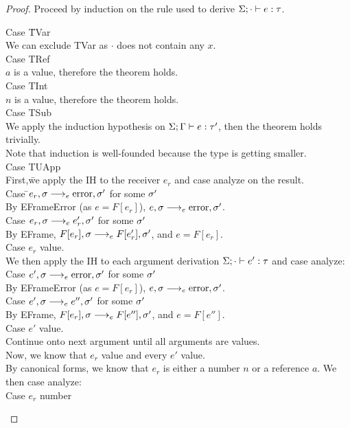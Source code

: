 \documentclass{report}
\begin{document}
\begin{proof}
Proceed by induction on the rule used to derive $\Sigma;\cdot \vdash e : \tau$.
\begin{tabbing}
Case \=TVar\\
\> We can exclude TVar as $\cdot$ does not contain any $x$.\\
Case TRef\\
\> $a$ is a value, therefore the theorem holds. \\
Case TInt\\
\> $n$ is a value, therefore the theorem holds. \\
Case TSub\\
\> We apply the induction hypothesis on $\Sigma;\Gamma\vdash e : \tau'$, then the theorem holds trivially.\\
\> Note that induction is well-founded because the type is getting smaller. \\
Case TUApp\\
\> First,\= we apply the IH to the receiver $e_r$ and case analyze on the result.\\
\> \> Case \=$e_r,\sigma \longrightarrow_{e} \text{error},\sigma'$ for some $\sigma'$\\
\> \> \> By EFrameError (as $e = F[e_r]$), $e,\sigma \longrightarrow_{e} \text{error},\sigma'$.\\
\> \> Case $e_r,\sigma \longrightarrow_{e} e'_r,\sigma'$ for some $\sigma'$\\
\> \> \> By EFrame, $F[e_r],\sigma \longrightarrow_{e} F[e_r'],\sigma'$, and $e = F[e_r]$.\\
\> \> Case $e_r$ value.\\
\> We then apply the IH to each argument derivation $\Sigma;\cdot \vdash e' : \tau$ and case analyze:\\
\> \> Case $e',\sigma \longrightarrow_{e} \text{error},\sigma'$ for some $\sigma'$\\
\> \> \> By EFrameError (as $e = F[e_r]$), $e,\sigma \longrightarrow_{e} \text{error},\sigma'$.\\
\> \> Case $e',\sigma \longrightarrow_{e} e'',\sigma'$ for some $\sigma'$\\
\> \> \> By EFrame, $F[e_r],\sigma \longrightarrow_{e} F[e''],\sigma'$, and $e = F[e'']$.\\
\> \> Case $e'$ value.\\
\> \> \> Continue onto next argument until all arguments are values. \\
\> Now, we know that $e_r$ value and every $e'$ value.\\
\> By canonical forms, we know that $e_r$ is either a number $n$ or a reference $a$. We then case analyze:\\
\> \> Case $e_r$ number \\

\end{tabbing}
\end{proof}
\end{document}

